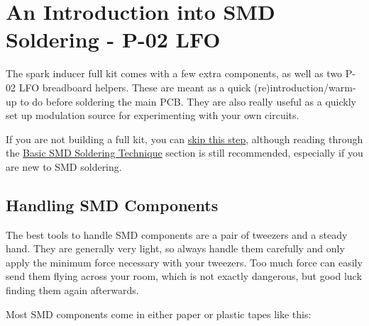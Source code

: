 \documentclass[12pt, a4paper]{article}
\begin{document}
\pagebreak
\renewcommand{\contentsname}{Build Steps}
\tableofcontents

\setcounter{section}{-1}

\pagebreak
\section{An Introduction into SMD Soldering \enspace - \enspace P-02 LFO}

The spark inducer full kit comes with a few extra components, as well as two P-02 LFO breadboard
helpers. These are meant as a quick (re)introduction/warm-up to do before soldering the main
PCB. They are also really useful as a quickly set up modulation source for experimenting with
your own circuits.

If you are not building a full kit, you can \hyperref[sec:smd_components]{skip this step},
although reading through the \hyperref[sec:basic_smd_soldering_techniques]{Basic SMD Soldering Technique}
section is still recommended, especially if you are new to SMD soldering.

\subsection{Handling SMD Components}

The best tools to handle SMD components are a pair of tweezers and a steady hand. They are
generally very light, so always handle them carefully and only apply the minimum force necessary
with your tweezers. Too much force can easily send them flying across your room, which is not
exactly dangerous, but good luck finding them again afterwards.

Most SMD components come in either paper or plastic tapes like this:
\end{document}
